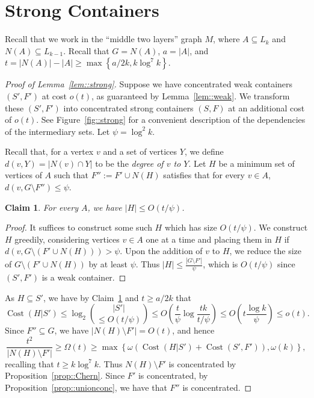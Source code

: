 \documentclass[12pt]{article}
\DeclareMathOperator{\cost}{Cost}
\newtheorem{claim}[theorem]{Claim}
\begin{document}
\section{Strong Containers}\label{sec::strong}

Recall that we work in the ``middle two layers'' graph $M$, where $A \subseteq L_k$ and $N(A) \subseteq L_{k-1}$. Recall that $G = N(A)$, $a = |A|$, and $t = |N(A)|-|A| \geq \max\left\{a/2k, k\log^7 k\right\}$.

\begin{proof}[Proof of Lemma~\ref{lem::strong}]
Suppose we have concentrated weak containers $(S', F')$ at cost $o(t)$, as guaranteed by Lemma~\ref{lem::weak}. We transform these $(S',F')$ into concentrated strong containers $(S,F)$ at an additional cost of $o(t)$. See Figure~\ref{fig::strong} for a convenient description of the dependencies of the intermediary sets. Let $\psi = \log^2 k$.

Recall that, for a vertex $v$ and a set of vertices $Y$, we define $d(v,Y) = |N(v) \cap Y|$ to be the \emph{degree of $v$ to $Y$}. Let $H$ be a minimum set of vertices of $A$ such that $F'' := F' \cup N(H)$ satisfies that for every $v \in A$, $d(v,G \setminus F'') \leq \psi$.

\begin{claim}\label{claim::H}
For every $A$, we have $|H| \leq O(t/\psi)$.
\end{claim}

\begin{proof}
It suffices to construct some such $H$ which has size $O(t/\psi)$. We construct $H$ greedily, considering vertices $v \in A$ one at a time and placing them in $H$ if $d(v,G \setminus (F' \cup N(H))) > \psi$. Upon the addition of $v$ to $H$, we reduce the size of $G \setminus (F' \cup N(H))$ by at least $\psi$. Thus $|H| \leq \frac{|G \setminus F'|}{\psi}$, which is $O(t/\psi)$ since $(S',F')$ is a weak container.
\end{proof}

As $H \subseteq S'$, we have by Claim~\ref{claim::H} and $t \geq a/2k$ that
\[ \cost(H|S') \leq \log_2\binom{|S'|}{\leq O(t/\psi)} \leq O\left( \frac{t}{\psi} \log\frac{tk}{t/\psi} \right) \leq O\left(t \frac{\log k}{\psi}\right) \leq o(t) .\]
Since $F'' \subseteq G$, we have $|N(H) \setminus F'| = O(t)$, and hence
\[ \frac{t^2}{|N(H) \setminus F'|} \geq \Omega(t) \geq \max\left\{\omega(\cost(H|S') + \cost(S',F')), \omega(k)\right\} ,\]
recalling that $t \geq k \log^7 k$. Thus $N(H) \setminus F'$ is concentrated by Proposition~\ref{prop::Chern}. Since $F'$ is concentrated, by Proposition~\ref{prop::unionconc}, we have that $F''$ is concentrated.


\end{proof}
\end{document}
